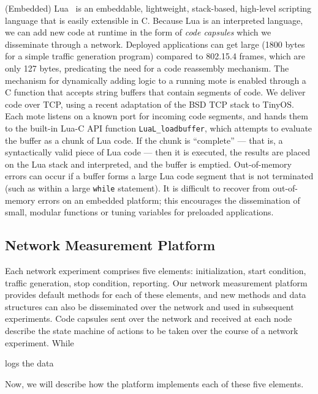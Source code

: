 (Embedded) Lua~\cite{elua} is an embeddable, lightweight, stack-based, high-level scripting language that is easily extensible in C.
Because Lua is an interpreted language, we can add new code at runtime in the form of \emph{code capsules} which we disseminate through a network.
Deployed applications can get large (1800 bytes for a simple traffic generation program) compared to 802.15.4 frames, which are only 127 bytes, predicating the need for a code reassembly mechanism.
The mechanism for dynamically adding logic to a running mote is enabled through a C function that accepts string buffers that contain segments of code.
We deliver code over TCP, using a recent adaptation of the BSD TCP stack to TinyOS.
Each mote listens on a known port for incoming code segments, and hands them to the built-in Lua-C API function \texttt{LuaL\_loadbuffer}, which attempts to evaluate the buffer as a chunk of Lua code.
If the chunk is ``complete'' --- that is, a syntactically valid piece of Lua code --- then it is executed, the results are placed on the Lua stack and interpreted, and the buffer is emptied.
Out-of-memory errors can occur if a buffer forms a large Lua code segment that is not terminated (such as within a large \texttt{while} statement).
It is difficult to recover from out-of-memory errors on an embedded platform; this encourages the dissemination of small, modular functions or tuning variables for preloaded applications.

\subsection{Network Measurement Platform}

Each network experiment comprises five elements: initialization, start condition, traffic generation, stop condition, reporting.
Our network measurement platform provides default methods for each of these elements, and new methods and data structures can also be disseminated over the network and used in subsequent experiments.
Code capsules sent over the network and received at each node describe the state machine of actions to be taken over the course of a network experiment.
While

logs the data


Now, we will describe how the platform implements each of these five elements.

